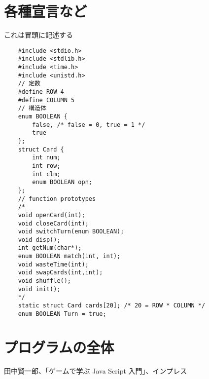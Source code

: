 \documentclass[uplatex,a4paper,11pt,oneside,openany]{jsarticle}
\begin{document}
\begin{comment}
	\section{手番の交代(switchTurn)}
	
	\begin{lstlisting}
		void switchTurn(enum BOOLEAN t){
			Turn = !t;
		}
	\end{lstlisting}
	
	\section{時間稼ぎ(wasteTime)}
	
	開いたカードを見せておく時間
	
	\begin{lstlisting}
		void wasteTime(int sec){
			sleep(sec);
		}
	\end{lstlisting}
\end{comment}

\section{各種宣言など}

これは冒頭に記述する

\begin{lstlisting}
	#include <stdio.h>
	#include <stdlib.h>
	#include <time.h>
	#include <unistd.h>
	// 定数
	#define ROW 4
	#define COLUMN 5
	// 構造体
	enum BOOLEAN {
		false, /* false = 0, true = 1 */
		true
	};
	struct Card {
		int num;
		int row;
		int clm;
		enum BOOLEAN opn;
	};
	// function prototypes
	/*
	void openCard(int);
	void closeCard(int);
	void switchTurn(enum BOOLEAN);
	void disp();
	int getNum(char*);
	enum BOOLEAN match(int, int);
	void wasteTime(int);
	void swapCards(int,int);
	void shuffle();
	void init();
	*/
	static struct Card cards[20]; /* 20 = ROW * COLUMN */
	enum BOOLEAN Turn = true;  
\end{lstlisting}

\newpage

\section{プログラムの全体}



%
\begin{thebibliography}{99}
	 田中賢一郎、「ゲームで学ぶ Java Script 入門」、インプレス
\end{thebibliography}
%
\end{document}
